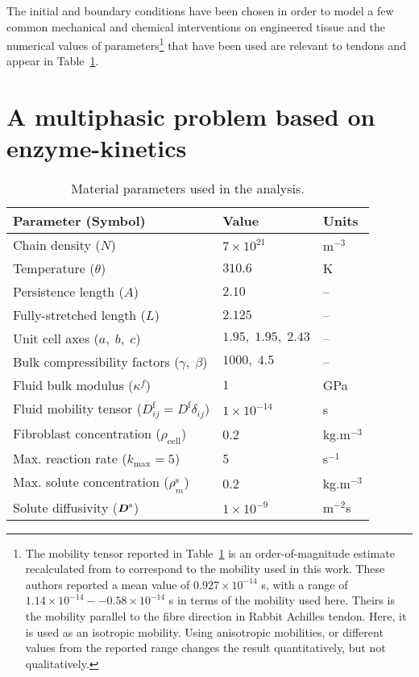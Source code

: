 The initial and boundary conditions have been chosen in order to model
a few common mechanical and chemical interventions on engineered
tissue and the numerical values of parameters\footnote{The mobility
  tensor reported in Table~\ref{parameters} is an order-of-magnitude
  estimate recalculated from \citet{Hanetal:2000} to correspond to the
  mobility used in this work. These authors reported a mean value of
  $0.927\times 10^{-14}$ s, with a range of $1.14\times
  10^{-14}--0.58\times 10^{-14}$ s in terms of the mobility used
  here. Theirs is the mobility parallel to the fibre direction in
  Rabbit Achilles tendon. Here, it is used as an isotropic
  mobility. Using anisotropic mobilities, or different values from the
  reported range changes the result quantitatively, but not
  qualitatively.} that have been used are relevant to tendons and
appear in Table~\ref{parameters}.

\section{A multiphasic problem based on enzyme-kinetics}
\label{enzyme-kinetics-example}

\begin{table}
\centering
\begin{tabular}{|l|l|l|}
\hline Parameter (Symbol) & Value & Units\\ \hline \hline Chain
density ($N$) & $7\times 10^{21}$ & $\mathrm{m}^{-3}$\\ Temperature
($\theta$) & $310.6$ & K\\ Persistence length ($A$) & $2.10$ &
--\\ Fully-stretched length ($L$) & $2.125$ & --\\ Unit cell axes
($a,\;b,\;c$) & $1.95,\;1.95,\;2.43$ & --\\ Bulk compressibility
factors ($\gamma,\;\beta$) & $1000,\; 4.5$ & --\\ Fluid bulk modulus
($\kappa^f$) & $1$ & GPa\\ Fluid mobility tensor ($D^\mathrm{f}_{ij} =
D^\mathrm{f}\delta_{ij}$) & $1\times 10^{-14}$ &s\\ Fibroblast
concentration ($\rho_{\mathrm{cell}}$) & 0.2 &
kg.m$^{-3}$\\ Max. reaction rate ($k_{\mathrm{max}} = 5$) & 5 &
s$^{-1}$\\ Max. solute concentration ($\rho^{\mathrm{s}}_m$) & 0.2 &
kg.m$^{-3}$\\ Solute diffusivity ($\mbox{\boldmath$ D$}^\mathrm{s}$) & $1\times
10^{-9}$ & m$^{-2}$s\\ \hline
\end{tabular}
\caption{Material parameters used in the analysis.}
\label{parameters}
\end{table}

